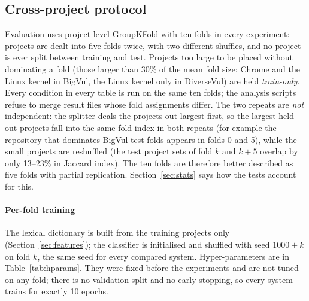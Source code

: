 \documentclass[pdflatex,sn-basic]{sn-jnl}
\theoremstyle{thmstyleone}%
\newcommand{\numcfgEpochs}{10}
\begin{document}
\subsection{Cross-project protocol}
\label{sec:protocol}
Evaluation uses project-level GroupKFold with ten folds in every experiment:
projects are dealt into five folds twice, with two different shuffles, and no
project is ever split between training and test. Projects too large to be placed
without dominating a fold (those larger than 30\% of the mean fold size: Chrome and the Linux kernel in
BigVul, the Linux kernel only in DiverseVul) are held \emph{train-only}. Every
condition in every table is run on the same ten folds; the analysis scripts
refuse to merge result files whose fold assignments differ. The two repeats are
\emph{not} independent: the splitter deals the projects out largest first, so
the largest held-out projects fall into the same fold index in both repeats
(for example the repository that dominates BigVul test folds appears in folds 0
and 5), while the small projects are reshuffled (the test project sets of fold
$k$ and $k+5$ overlap by only 13--23\% in Jaccard index). The ten folds are
therefore better described as five folds with partial replication.
Section~\ref{sec:stats} says how the tests account for this.

\paragraph{Per-fold training} The lexical dictionary is built from the training
projects only (Section~\ref{sec:features}); the classifier is initialised and
shuffled with seed $1000+k$ on fold $k$, the same seed for every compared
system. Hyper-parameters are in Table~\ref{tab:hparams}. They were fixed before
the experiments and are not tuned on any fold; there is no validation split and
no early stopping, so every system trains for exactly \numcfgEpochs{} epochs.
\end{document}
